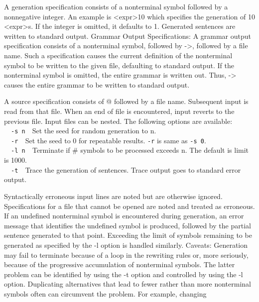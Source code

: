 {A generation specification consists of a nonterminal symbol followed by
a nonnegative integer. An example is {\textless}expr{\textgreater}10
which specifies the generation of 10 {\textless}expr{\textgreater}s. If
the integer is omitted, it defaults to 1. Generated sentences are
written to standard output. Grammar Output Specifications: A grammar
output specification consists of a nonterminal symbol, followed by
-{\textgreater}, followed by a file name. Such a specification causes
the current definition of the nonterminal symbol to be written to the
given file, defaulting to standard output. If the nonterminal symbol is
omitted, the entire grammar is written out. Thus, -{\textgreater}
causes the entire grammar to be written to standard output.

A source specification consists of @ followed by a file name. Subsequent
input is read from that file. When an end of file is encountered, input
reverts to the previous file. Input files can be nested. The following
options are available:\\
\ \ \texttt{{}-s n}\ \ Set the seed for random generation to n.\\
\ \ \texttt{{}-r\ \ }Set the seed to 0 for repeatable results.
\texttt{{}-r} is same as \texttt{{}-s 0}.\\
\ \ \texttt{{}-l n\ \ }Terminate if \# symbols to be processed exceeds
n. The default is limit is 1000.\\
\ \ \texttt{{}-t\ \ }Trace the generation of sentences. Trace output
goes to standard error output.

Syntactically erroneous input lines are noted but are otherwise ignored.
Specifications for a file that cannot be opened are noted and treated
as erroneous. If an undefined nonterminal symbol is encountered during
generation, an error message that identifies the undefined symbol is
produced, followed by the partial sentence generated to that point.
Exceeding the limit of symbols remaining to be generated as specified
by the -l option is handled similarly. Caveats: Generation may fail to
terminate because of a loop in the rewriting rules or, more seriously,
because of the progressive accumulation of nonterminal symbols. The
latter problem can be identified by using the -t option and controlled
by using the -l option. Duplicating alternatives that lead to fewer
rather than more nonterminal symbols often can circumvent the problem.
For example, changing


}
